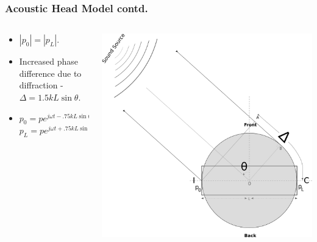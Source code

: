 \documentclass{beamer}
\begin{document}
\begin{frame}[t]
 \frametitle{Acoustic Head Model contd.}
 \begin{columns}
     \begin{column}{.5\textwidth}
    \small
    \flushleft
     \begin{itemize}
      \item $|p_0|=|p_L|$.
      \item Increased  phase difference due to diffraction - $\Delta=1.5kL\sin\theta$.
      \item $p_0=pe^{j\omega t -.75kL\sin\theta}$\\ $p_L=pe^{j\omega t +.75kL\sin\theta}$
      \end{itemize}

    \end{column}
    
 \begin{column}{0.5\textwidth}
    \includegraphics[width = 6 cm]{Diagrams/Presentation/acousticheadmodel2.png}\\
    \end{column}

    \end{columns}
\end{frame}
\end{document}
